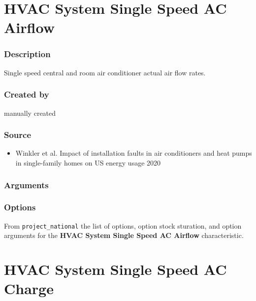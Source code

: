 \section{HVAC System Single Speed AC
Airflow}\label{hvac_system_single_speed_ac_airflow}

\subsubsection{Description}\label{description-81}

Single speed central and room air conditioner actual air flow rates.

\subsubsection{Created by}\label{created-by-81}

manually created

\subsubsection{Source}\label{source-80}

\begin{itemize}
 
\item
  Winkler et al. \textquotesingle Impact of installation faults in air
  conditioners and heat pumps in single-family homes on US energy
  usage\textquotesingle{} 2020
\end{itemize}

\subsubsection{Arguments}\label{arguments-50}



\subsubsection{Options}\label{options-81}

From \texttt{project\_national} the list of options, option stock
sturation, and option arguments for the \textbf{HVAC System Single Speed
AC Airflow} characteristic.



\section{HVAC System Single Speed AC
Charge}\label{hvac_system_single_speed_ac_charge}


